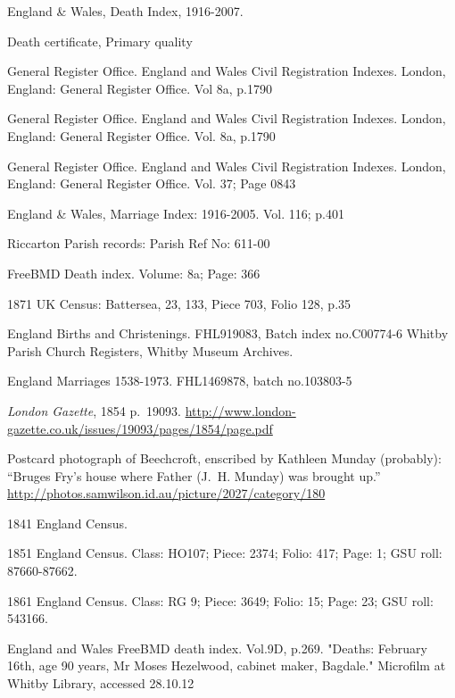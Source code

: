 \begin{thebibliography}{99}
	England \& Wales, Death Index, 1916-2007.
	
	Death certificate, Primary quality
	
	General Register Office. England and Wales Civil Registration Indexes. London, England: General Register 		Office. Vol 8a, p.1790

	General Register Office. England and Wales Civil Registration Indexes. London, England: General Register 		Office. Vol. 8a, p.1790
	
	General Register Office. England and Wales Civil Registration Indexes. London, England: General Register 		Office. Vol. 37; Page 0843
	
	England \& Wales, Marriage Index: 1916-2005. Vol. 116; p.401

	Riccarton Parish records: Parish Ref No: 611-00
	
	FreeBMD Death index. Volume: 8a; Page: 366
	
	1871 UK Census: Battersea, 23, 133, Piece 703, Folio 128, p.35 
	
	 England Births and Christenings. FHL919083, Batch index no.C00774-6
	 Whitby Parish Church Registers, Whitby Museum Archives.
	 
	England Marriages 1538-1973. FHL1469878, batch no.103803-5

	\emph{London Gazette}, 1854 p.~19093.
	\url{http://www.london-gazette.co.uk/issues/19093/pages/1854/page.pdf}

	Postcard photograph of Beechcroft,
	enscribed by Kathleen Munday (probably):
	``Bruges Fry's house where Father (J.~H. Munday) was brought up.''
	\url{http://photos.samwilson.id.au/picture/2027/category/180}

	1841 England Census. 
	
	1851 England Census. Class: HO107; Piece: 2374; Folio: 417; Page: 1; GSU roll: 87660-87662.
	
	1861 England Census. Class: RG 9; Piece: 3649; Folio: 15; Page: 23; GSU roll: 543166.
	
	England and Wales FreeBMD death index. Vol.9D, p.269. 
	"Deaths: February 16th, age 90 years, Mr Moses Hezelwood, cabinet maker, Bagdale." Microfilm at Whitby 			Library, accessed 28.10.12
	

\end{thebibliography}
